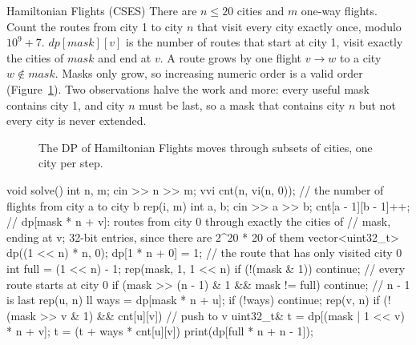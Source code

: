 \begin{problem}{Hamiltonian Flights (CSES)}
There are $n \le 20$ cities and $m$ one-way flights. Count the routes from city 1 to city $n$ that visit every city exactly once,
modulo $10^9 + 7$.
\solution $dp[\mathit{mask}][v]$ is the number of routes that start at city 1, visit exactly the cities of $\mathit{mask}$ and end
at $v$. A route grows by one flight $v \to w$ to a city $w \notin \mathit{mask}$. Masks only grow, so increasing numeric order is a
valid order (Figure~\ref{fig:hamilton}). Two observations halve the work and more: every useful mask contains city 1, and city $n$
must be last, so a mask that contains city $n$ but not every city is never extended.
\end{problem}

\begin{figure}[htbp]
\centering
{}
\caption{The DP of Hamiltonian Flights moves through subsets of cities, one city per step.}
\label{fig:hamilton}
\end{figure}

\begin{code}
void solve() {
    int n, m;
    cin >> n >> m;
    vvi cnt(n, vi(n, 0));  // the number of flights from city a to city b
    rep(i, m) {
        int a, b;
        cin >> a >> b;
        cnt[a - 1][b - 1]++;
    }
    // dp[mask * n + v]: routes from city 0 through exactly the cities of
    // mask, ending at v; 32-bit entries, since there are 2^20 * 20 of them
    vector<uint32_t> dp((1 << n) * n, 0);
    dp[1 * n + 0] = 1;  // the route that has only visited city 0
    int full = (1 << n) - 1;
    rep(mask, 1, 1 << n) {
        if (!(mask & 1)) continue;  // every route starts at city 0
        if (mask >> (n - 1) & 1 && mask != full) continue;  // n - 1 is last
        rep(u, n) {
            ll ways = dp[mask * n + u];
            if (!ways) continue;
            rep(v, n) if (!(mask >> v & 1) && cnt[u][v]) {  // push to v
                uint32_t& t = dp[(mask | 1 << v) * n + v];
                t = (t + ways * cnt[u][v]) %
            }
        }
    }
    print(dp[full * n + n - 1]);
}
\end{code}

